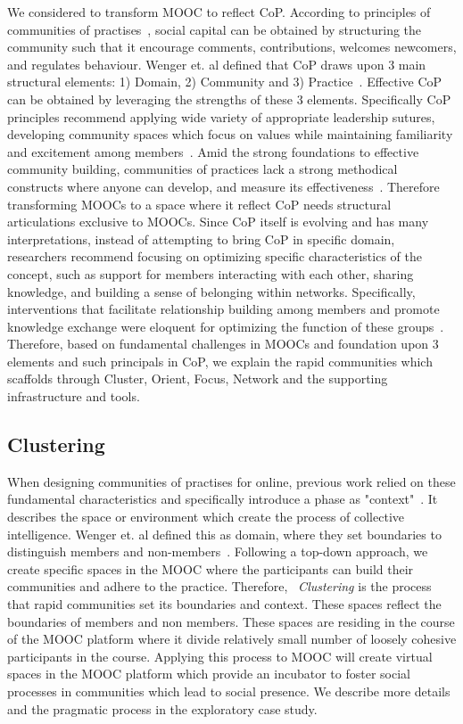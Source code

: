 \documentclass[manuscript,screen,review]{acmart}
\begin{document}
We considered to transform MOOC to reflect CoP. According to principles of communities of practises~\cite{wenger2002seven}, social capital can be obtained by structuring the community such that it encourage comments, contributions, welcomes newcomers, and regulates behaviour. Wenger et. al defined that CoP draws upon 3 main structural elements: 1) Domain, 2) Community and 3) Practice~\cite{wenger2002cultivating}. Effective CoP can be obtained by leveraging the strengths of these 3 elements. Specifically CoP principles recommend applying wide variety of appropriate leadership sutures, developing community spaces which focus on values while maintaining familiarity and excitement among members~\cite{wenger2002cultivating}. Amid the strong foundations to effective community building, communities of practices lack a strong methodical constructs where anyone can develop, and measure its effectiveness~\cite{li2009evolution}. Therefore transforming MOOCs to a space where it reflect CoP needs structural articulations exclusive to MOOCs. Since CoP itself is evolving and has many interpretations, instead of attempting to bring CoP in specific domain, researchers recommend focusing on optimizing specific characteristics of the concept, such as support for members interacting with each other, sharing knowledge, and building a sense of belonging within networks. Specifically, interventions that facilitate relationship building among members and promote knowledge exchange were eloquent for optimizing the function of these groups~\cite{li2009evolution}. Therefore, based on fundamental challenges in MOOCs and foundation upon 3 elements and such principals in CoP, we explain the rapid communities which scaffolds through Cluster, Orient, Focus, Network and the supporting infrastructure and tools. 

\subsection{Clustering} 
When designing communities of practises for online, previous work relied  on these fundamental characteristics and specifically introduce a phase as "context"~\cite{gunawardena2009theoretical}. It describes the space or environment which create the process of collective intelligence. Wenger et. al defined this as domain, where they set boundaries to distinguish members and non-members~\cite{wenger2010communities}. Following a top-down approach, we create specific spaces in the MOOC where the participants can build their communities and adhere to the practice. Therefore, ~\textit{Clustering} is the process that rapid communities set its boundaries and context. These spaces reflect the boundaries of members and non members. These spaces are residing in the course of the MOOC platform where it divide relatively small number of loosely cohesive participants in the course.  Applying this process to MOOC will create virtual spaces in the MOOC platform which provide an incubator to foster social processes in communities which lead to social presence. We describe more details and the pragmatic process in the exploratory case study. 
\end{document}
